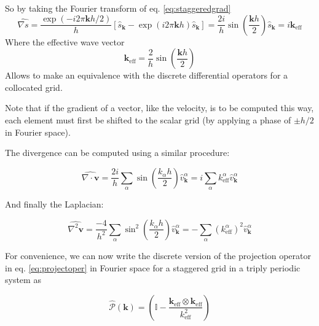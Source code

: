 \documentclass[ twoside,openright,titlepage,numbers=noenddot,%
headinclude,footinclude,cleardoublepage=empty,abstract=on,
BCOR=5mm,paper=a4,fontsize=11pt, dvipsnames
]{scrreprt}
\renewcommand{\vec}[1]{\bm{#1}}
\newcommand{\oper}[1]{\mathcal{#1}}
\newcommand{\fou}[1]{\widehat{#1}}
\begin{document}
So by taking the Fourier transform of eq. \eqref{eq:staggeredgrad}
\begin{equation}
  \label{eq:staggeredgradfou}
  \fou{\nabla s} = \frac{\exp(-i2\pi \vec{k} h/2)}{h}\left[\fou{s}_{\vec{k}} - \exp(i2\pi \vec{k} h)\fou{s}_{\vec{k}}\right] = \frac{2i}{h}\sin\left(\frac{\vec{k} h}{2}\right)\fou{s}_{\vec{k}} = i\vec{k}_{\text{eff}}
\end{equation}
Where the effective wave vector
\begin{equation}
  \vec{k}_{\text{eff}} = \frac{2}{h}\sin\left(\frac{\vec{k}h}{2}\right)
\end{equation}
Allows to make an equivalence with the discrete differential operators for a collocated grid.

Note that if the gradient of a vector, like the velocity, is to be computed this way, each element must first be shifted to the scalar grid (by applying a phase of $\pm h/2$ in Fourier space).

The divergence can be computed using a similar procedure:

\begin{equation}
  \label{eq:staggereddivfou}
  \fou{\nabla\cdot\vec{v}} = \frac{2i}{h}\sum_\alpha\sin\left(\frac{k_\alpha h}{2}\right)\fou{v}_{\vec{k}}^\alpha = i \sum_\alpha k^\alpha_{\text{eff}}\fou{v}_{\vec{k}}^\alpha
\end{equation}

And finally the Laplacian:

\begin{equation}
  \label{eq:staggeredlapfou}
  \fou{\nabla^2\vec{v}} = \frac{-4}{h^2}\sum_\alpha\sin^2\left(\frac{k_\alpha h}{2}\right)\fou{v}_{\vec{k}}^\alpha = -\sum_\alpha \left(k^\alpha_{\text{eff}}\right)^2\fou{v}_{\vec{k}}^\alpha
\end{equation}

For convenience, we can now write the discrete version of the projection operator in eq. \eqref{eq:projectoper} in Fourier space for a staggered grid in a triply periodic system as

\begin{equation}
  \label{eq:staggeredprojection}
  \fou{\oper{P}}(\vec{k}) = \left(\mathbb{I} - \frac{\vec{k}_{\text{eff}}\otimes\vec{k}_{\text{eff}}}{k_{\text{eff}}^2}\right)
\end{equation}
\end{document}
